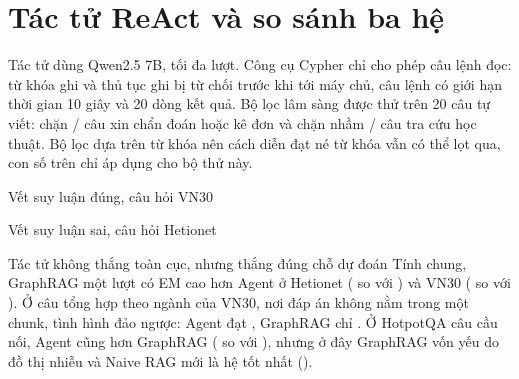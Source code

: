 \section{Tác tử ReAct và so sánh ba hệ}

Tác tử dùng Qwen2.5 7B, tối đa  lượt. Công cụ Cypher chỉ cho phép câu lệnh đọc: từ khóa ghi và thủ tục ghi bị từ chối trước khi tới máy chủ, câu lệnh có giới hạn thời gian 10 giây và 20 dòng kết quả. Bộ lọc lâm sàng được thử trên 20 câu tự viết: chặn / câu xin chẩn đoán hoặc kê đơn và chặn nhầm / câu tra cứu học thuật. Bộ lọc dựa trên từ khóa nên cách diễn đạt né từ khóa vẫn có thể lọt qua, con số trên chỉ áp dụng cho bộ thử này.



\begin{vetsuyluan}{Vết suy luận đúng, câu hỏi VN30}

\end{vetsuyluan}

\begin{vetsuyluan}{Vết suy luận sai, câu hỏi Hetionet}

\end{vetsuyluan}

\begin{phathien}{Tác tử không thắng toàn cục, nhưng thắng đúng chỗ dự đoán}
Tính chung, GraphRAG một lượt có EM cao hơn Agent ở Hetionet ( so với ) và VN30 ( so với ). Ở câu tổng hợp theo ngành của VN30, nơi đáp án không nằm trong một chunk, tình hình đảo ngược: Agent đạt , GraphRAG chỉ . Ở HotpotQA câu cầu nối, Agent cũng hơn GraphRAG ( so với ), nhưng ở đây GraphRAG vốn yếu do đồ thị nhiễu và Naive RAG mới là hệ tốt nhất ().
\end{phathien}


